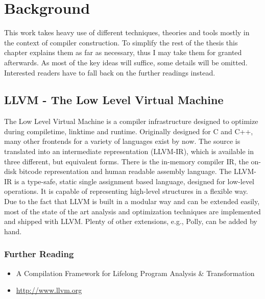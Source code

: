 
\chapter{Background} %
\label{Chapter2}

This work takes heavy use of different techniques, theories and tools mostly 
in the context of compiler construction. To simplify the rest of the thesis 
this chapter explains them as far as necessary, thus I may take
them for granted afterwards. As most of the key ideas will suffice, 
some details will be omitted. 
Interested readers have to fall back on the further readings instead. 


\section{LLVM - The Low Level Virtual Machine}
\label{LLVM}
The Low Level Virtual Machine is a compiler infrastructure designed to optimize
during compiletime, linktime and runtime. Originally designed for C and C++, 
many other frontends for a variety of languages exist by now. The source is 
translated into an intermediate representation (LLVM-IR), which is available 
in three different, but equivalent forms. There is the in-memory compiler IR, 
the on-disk bitcode representation and human readable assembly language.
The LLVM-IR is a type-safe, static single assignment based language,
designed for low-level operations. It is capable of 
representing high-level structures in a flexible way.
Due to the fact that LLVM is built in a modular 
way and can be extended easily, most of the state of the art analysis and
optimization techniques are implemented and shipped with LLVM. Plenty of other
extensions, e.g., Polly, can be added by hand. 


\subsection*{Further Reading}

\begin{itemize}
  \item A Compilation Framework for Lifelong Program Analysis \& Transformation
    \cite{LLVM:CGO04}  
  \item \url{http://www.llvm.org} \nocite{LLVM:Online}
\end{itemize}



